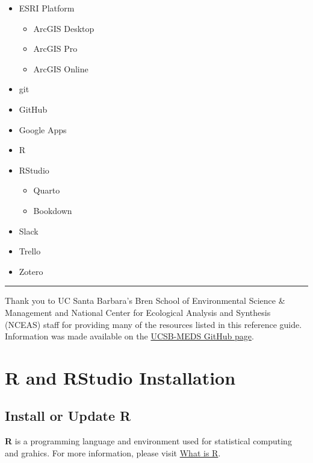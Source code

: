\documentclass[
]{book}
\providecommand{\tightlist}{%
  \setlength{\itemsep}{0pt}\setlength{\parskip}{0pt}}
\begin{document}
\begin{itemize}
\tightlist
\item
  ESRI Platform

  \begin{itemize}
  \tightlist
  \item
    ArcGIS Desktop
  \item
    ArcGIS Pro
  \item
    ArcGIS Online
  \end{itemize}
\item
  git
\item
  GitHub
\item
  Google Apps
\item
  R
\item
  RStudio

  \begin{itemize}
  \tightlist
  \item
    Quarto
  \item
    Bookdown
  \end{itemize}
\item
  Slack
\item
  Trello
\item
  Zotero
\end{itemize}

\begin{center}\rule{0.5\linewidth}{0.5pt}\end{center}

Thank you to UC Santa Barbara's Bren School of Environmental Science \& Management and National Center for Ecological Analysis and Synthesis (NCEAS) staff for providing many of the resources listed in this reference guide. Information was made available on the \href{https://github.com/UCSB-MEDS}{UCSB-MEDS GitHub page}.

\hypertarget{r}{%
\chapter{R and RStudio Installation}\label{r}}

\hypertarget{install-or-update-r}{%
\section{Install or Update R}\label{install-or-update-r}}

\textbf{R} is a programming language and environment used for statistical computing and grahics. For more information, please visit \href{https://www.r-project.org/about.html}{What is R}.
\end{document}
